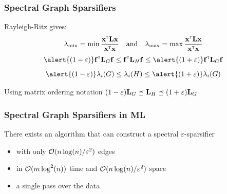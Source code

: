 \documentclass{beamer}
\newcommand{\misoclasstinytitleslide}{Partially based on material by:  Rob Fergus, Nikhil Srivastava,\\[-1em] 
Yiannis Koutis, Joshua Batson, Daniel Spielman}
\begin{document}

\newcommand{\topictitle}{Spectral Graph Sparsifiers: Theory}

\newcommand{\topicsubtitle}{Effective Resistance and Spielman-Teng Algorithm}
\renewcommand{\misoclasstinytitleslide}{Partially based on material by:  Rob Fergus, Nikhil Srivastava,\\[-1em] Yiannis Koutis, Joshua Batson, Daniel Spielman}

\MakeTopicSlide

\begin{frame}
\frametitle{Spectral Graph Sparsifiers}
Rayleigh-Ritz gives:
\pause 
\vspace{-0.5\baselineskip}
\[
\lambda_{\min} = \min \frac{\mathbf{x}^\mathsf{\scriptscriptstyle T}\mathbf{L}\mathbf{x} }{\mathbf{x}^\mathsf{\scriptscriptstyle T}\mathbf{x}}
\quad \text{and} \quad 
\lambda_{\max} = \max \frac{\mathbf{x}^\mathsf{\scriptscriptstyle T}\mathbf{L}\mathbf{x} }{\mathbf{x}^\mathsf{\scriptscriptstyle T}\mathbf{x}}
\]
\pause 
{}
\pause 
\[
\alert{(1-\eps)} \bff\transpose\bL_{G}\bff  \leq  \bff\transpose\bL_{H}\bff  \leq  \alert{(1+\eps)} \bff\transpose\bL_{G}\bff 
\]
\pause 
{}
\[
\alert{(1-\eps)} \lambda_i(G)  \leq  \lambda_i(H)  \leq  \alert{(1+\eps)} \lambda_i(G) 
\]

\vspace{-0.5\baselineskip}
Using matrix ordering notation $(1-\varepsilon)\mathbf{L}_{G} \preceq \mathbf{L}_{H}  \preceq (1+\varepsilon) \mathbf{L}_{G}$

\pause

\vspace{0.5\baselineskip}
\end{frame}
\begin{frame}
    \frametitle{Spectral Graph Sparsifiers in ML}

\begin{proposition}
\normalfont
There exists an algorithm that can construct a spectral $\varepsilon$-sparsifier
\begin{itemize}%
\pause
\item with only $\mathcal{O}(n\log(n)/\varepsilon^2)$ edges
\pause
\item in $\mathcal{O}(m\log^2(n))$ time and $\mathcal{O}(n\log(n)/\varepsilon^2)$ space
\pause
\item a single pass over the data
\end{itemize}
\end{proposition}
\end{frame}
\end{document}
